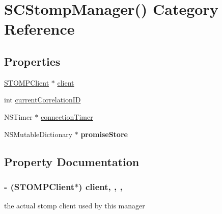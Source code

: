 \hypertarget{category_s_c_stomp_manager_07_08}{}\section{S\+C\+Stomp\+Manager() Category Reference}
\label{category_s_c_stomp_manager_07_08}
\subsection*{Properties}
\begin{DoxyCompactItemize}
\item 
\hyperlink{interface_s_t_o_m_p_client}{S\+T\+O\+M\+P\+Client} $\ast$ \hyperlink{category_s_c_stomp_manager_07_08_aebb91005a479bb58b0140e69a0a7ca0a}{client}
\item 
int \hyperlink{category_s_c_stomp_manager_07_08_a86c0ffd921e9b2aa866eb389a59c22dd}{current\+Correlation\+ID}
\item 
N\+S\+Timer $\ast$ \hyperlink{category_s_c_stomp_manager_07_08_a9134fe65e24f68d532c032e9b2bc8f9c}{connection\+Timer}
\item 
N\+S\+Mutable\+Dictionary $\ast$ {\bfseries promise\+Store}\hypertarget{category_s_c_stomp_manager_07_08_ac2cb7b78f575e81cc677b474c48d28dd}{}\label{category_s_c_stomp_manager_07_08_ac2cb7b78f575e81cc677b474c48d28dd}

\end{DoxyCompactItemize}


\subsection{Property Documentation}
\subsubsection[{\texorpdfstring{client}{client}}]{\setlength{\rightskip}{0pt plus 5cm}-\/ ({\bf S\+T\+O\+M\+P\+Client}$\ast$) client\hspace{0.3cm}{\ttfamily [read]}, {\ttfamily [write]}, {\ttfamily [nonatomic]}, {\ttfamily [retain]}}\hypertarget{category_s_c_stomp_manager_07_08_aebb91005a479bb58b0140e69a0a7ca0a}{}\label{category_s_c_stomp_manager_07_08_aebb91005a479bb58b0140e69a0a7ca0a}
the actual stomp client used by this manager 
